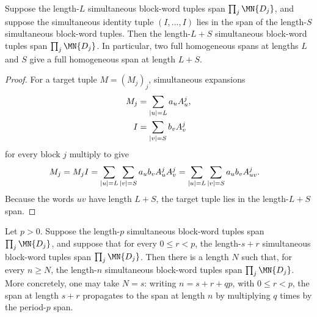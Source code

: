 \begin{lemma}
    \label{lem:homogeneous_word_tuple_span_padding}
    \leanok
    Suppose the length-$L$ simultaneous block-word tuples span
    $\prod_j \MN{D_j}$, and suppose the simultaneous identity tuple
    $(I,\ldots,I)$ lies in the span of the length-$S$ simultaneous block-word
    tuples. Then the length-$L+S$ simultaneous block-word tuples span
    $\prod_j \MN{D_j}$. In particular, two full homogeneous spans at lengths
    $L$ and $S$ give a full homogeneous span at length $L+S$.
\end{lemma}

\begin{proof}
    \leanok
    For a target tuple $M=(M_j)_j$, simultaneous expansions
    \begin{align}
        M_j & = \sum_{|u|=L} a_u A^j_u,
        \notag                          \\
        I   & = \sum_{|v|=S} b_v A^j_v
        \notag
    \end{align}
    for every block $j$ multiply to give
    \begin{align}
        M_j
         & =
        M_j I =
        \sum_{|u|=L}\sum_{|v|=S}
        a_u b_v A^j_uA^j_v =
        \sum_{|u|=L}\sum_{|v|=S}
        a_u b_v A^j_{uv}.
        \notag
    \end{align}
    Because the words $uv$ have length $L+S$, the target tuple lies in the
    length-$L+S$ span.
\end{proof}

\begin{lemma}
    \label{lem:period_window_word_tuple_span_padding}
    \leanok
    Let $p>0$. Suppose the length-$p$ simultaneous block-word tuples span
    $\prod_j \MN{D_j}$, and suppose that for every $0\le r<p$, the
    length-$s+r$ simultaneous block-word tuples span $\prod_j \MN{D_j}$.
    Then there is a length $N$ such that, for every $n\ge N$, the length-$n$
    simultaneous block-word tuples span $\prod_j \MN{D_j}$. More concretely,
    one may take $N=s$: writing $n=s+r+qp$, with $0\le r<p$, the span at
    length $s+r$ propagates to the span at length $n$ by multiplying $q$ times
    by the period-$p$ span.
\end{lemma}

